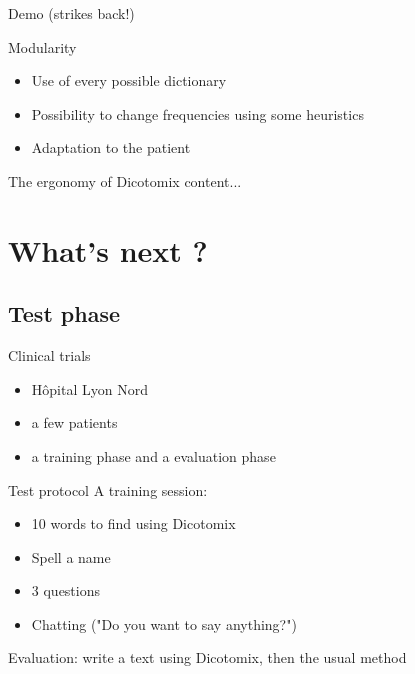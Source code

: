 \documentclass[graphics]{beamer}
\begin{document}
\begin{frame}{Demo (strikes back!)}
\end{frame}

\begin{frame}{Modularity}
	\begin{center}
		\begin{itemize}
			\item Use of every possible dictionary %
			\item Possibility to change frequencies using some heuristics
			\item Adaptation to the patient
		\end{itemize}
	\end{center}
\end{frame}



\begin{frame}{The ergonomy of Dicotomix}
	content...
\end{frame}

\section{What's next ?}
\subsection{Test phase}
\begin{frame}{Clinical trials}
	\begin{center}
		\begin{itemize}
			\item Hôpital Lyon Nord %
			\item a few patients
			\item a training phase and a evaluation phase %
		\end{itemize}
	\end{center}
\end{frame}


\begin{frame}{Test protocol}
	A training session:
	\begin{itemize}
		\item 10 words to find using Dicotomix
		\item Spell a name
		\item 3 questions
		\item Chatting ("Do you want to say anything?")
	\end{itemize}
	Evaluation: write a text using Dicotomix, then the usual method
\end{frame}
\end{document}
